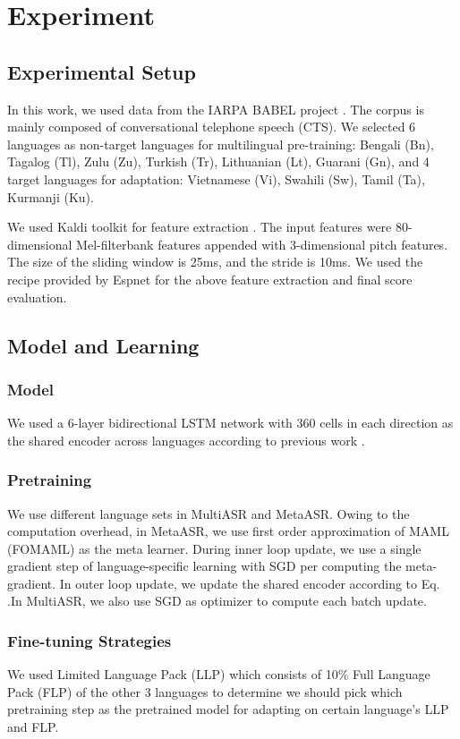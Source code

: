\section{Experiment}
\label{sec:exp}

\subsection{Experimental Setup}
\label{ssec:exp-setup}
In this work, we used data from the IARPA BABEL project \cite{gales2014speech}. The corpus is mainly composed of conversational telephone speech (CTS). We selected 6 languages as non-target languages for multilingual pre-training: Bengali (Bn), Tagalog (Tl), Zulu (Zu), Turkish (Tr), Lithuanian (Lt), Guarani (Gn), and 4 target languages for adaptation: Vietnamese (Vi), Swahili (Sw), Tamil (Ta), Kurmanji (Ku). 

We used Kaldi toolkit for feature extraction \cite{povey2011kaldi}. The input features were 80-dimensional Mel-filterbank features appended with 3-dimensional pitch features. The size of the sliding window is 25ms, and the stride is 10ms. We used the recipe provided by Espnet \cite{watanabe2018espnet} for the above feature extraction and final score evaluation.

\vspace{-5pt}
\subsection{Model and Learning}
\subsubsection{Model}
We used a 6-layer bidirectional LSTM network with 360 cells in each direction as the shared encoder across languages according to previous work \cite{dalmia2018sequence}.

\vspace{-5pt}
\subsubsection{Pretraining}
We use different language sets in MultiASR and MetaASR. Owing to the computation overhead, in MetaASR, we use first order approximation of MAML (FOMAML) as the meta learner. During inner loop update, we use a single gradient step of language-specific learning with SGD per computing the meta-gradient. In outer loop update, we update the shared encoder according to Eq. .In MultiASR, we also use SGD as optimizer to compute each batch update.
\vspace{-5pt}
\subsubsection{Fine-tuning Strategies}
We used Limited Language Pack (LLP) which consists of 10\% Full Language Pack (FLP) of the other 3 languages to determine we should pick which pretraining step as the pretrained model for adapting on certain language's LLP and FLP.

